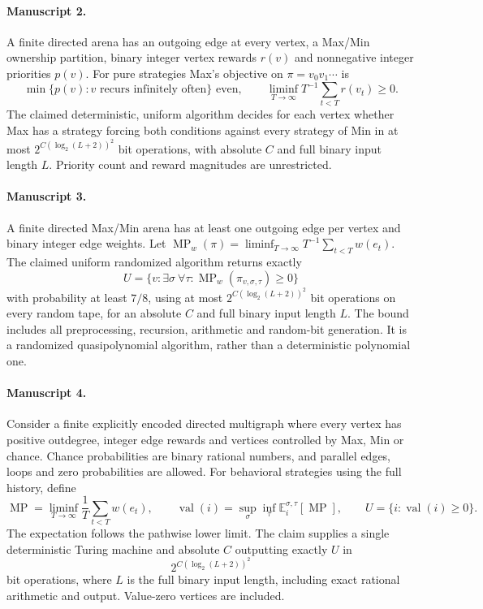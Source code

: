 \documentclass[11pt]{article}
\begin{document}
\paragraph{Manuscript 2.}
A finite directed arena has an outgoing edge at every vertex, a Max/Min ownership partition, binary integer vertex rewards $r(v)$ and nonnegative integer priorities $p(v)$. For pure strategies Max's objective on $\pi=v_0v_1\cdots$ is
\[
 \min\{p(v):v\text{ recurs infinitely often}\}\text{ even},\qquad
 \liminf_{T\to\infty}T^{-1}\sum_{t<T}r(v_t)\ge0.
\]
The claimed deterministic, uniform algorithm decides for each vertex whether Max has a strategy forcing both conditions against every strategy of Min in at most $2^{C(\log_2(L+2))^2}$ bit operations, with absolute $C$ and full binary input length $L$. Priority count and reward magnitudes are unrestricted.

\paragraph{Manuscript 3.}
A finite directed Max/Min arena has at least one outgoing edge per vertex and binary integer edge weights. Let $\operatorname{MP}_w(\pi)=\liminf_{T\to\infty}T^{-1}\sum_{t<T}w(e_t)$. The claimed uniform randomized algorithm returns exactly
\[
 U=\{v:\exists\sigma\ \forall\tau:\operatorname{MP}_w(\pi_{v,\sigma,\tau})\ge0\}
\]
with probability at least $7/8$, using at most $2^{C(\log_2(L+2))^2}$ bit operations on every random tape, for an absolute $C$ and full binary input length $L$. The bound includes all preprocessing, recursion, arithmetic and random-bit generation. It is a randomized quasipolynomial algorithm, rather than a deterministic polynomial one.

\paragraph{Manuscript 4.}
Consider a finite explicitly encoded directed multigraph where every vertex has positive outdegree, integer edge rewards and vertices controlled by Max, Min or chance. Chance probabilities are binary rational numbers, and parallel edges, loops and zero probabilities are allowed. For behavioral strategies using the full history, define
\[
 \operatorname{MP}=\liminf_{T\to\infty}\frac1T\sum_{t<T}w(e_t),\qquad
 \operatorname{val}(i)=\sup_{\sigma}\inf_{\tau}\mathbb E_i^{\sigma,\tau}[\operatorname{MP}],
 \qquad U=\{i:\operatorname{val}(i)\ge0\}.
\]
The expectation follows the pathwise lower limit. The claim supplies a single deterministic Turing machine and absolute $C$ outputting exactly $U$ in
\[
 2^{C(\log_2(L+2))^2}
\]
bit operations, where $L$ is the full binary input length, including exact rational arithmetic and output. Value-zero vertices are included.
\end{document}

